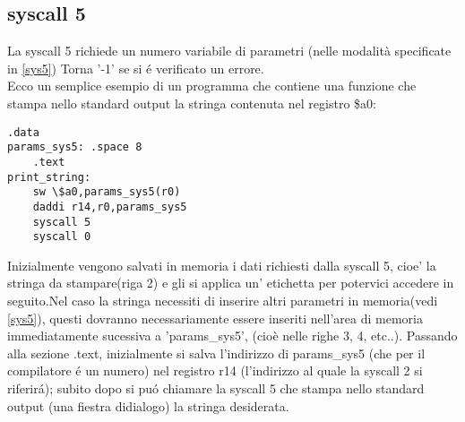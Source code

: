 \documentclass[12pt]{report}
\begin{document}
\subsection{syscall 5}
La syscall 5 richiede un numero variabile di parametri (nelle modalità specificate in  \ref{sys5})
Torna '-1' se si \'{e} verificato un errore.\\ 
Ecco un semplice esempio di un programma che contiene una funzione che stampa nello standard output
la stringa contenuta nel registro \$a0:
\begin{lstlisting}[caption={syscall5}, label={code:syscall5}, style={mips}]
    .data
params_sys5: .space 8	  			
	.text
print_string:
	sw \$a0,params_sys5(r0)	
	daddi r14,r0,params_sys5
	syscall 5
	syscall 0				
\end{lstlisting}
Inizialmente vengono salvati in memoria i dati richiesti dalla syscall 5, cioe' la stringa da stampare(riga 2) e gli si applica un' etichetta
 per potervici accedere in seguito.Nel caso la stringa necessiti di inserire altri parametri in memoria(vedi \ref{sys5}), questi dovranno
necessariamente essere inseriti nell'area di memoria immediatamente sucessiva a 'params_sys5', (cioè nelle righe 3, 4, etc..).
Passando alla sezione .text, inizialmente si salva l'indirizzo di params_sys5 (che per il compilatore \'{e} un numero) nel registro r14
(l'indirizzo al quale la syscall 2 si riferir\'{a}); subito dopo si pu\'{o} chiamare la syscall 5 che stampa nello standard output (una fiestra didialogo)
la stringa desiderata.
\end{document}
